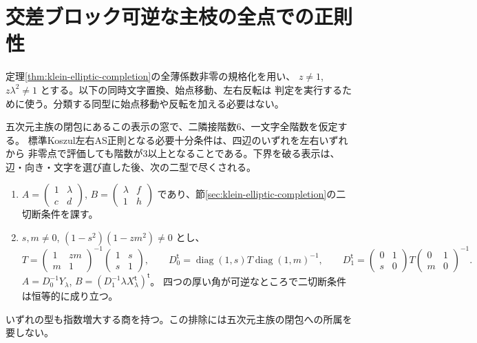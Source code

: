 \section{交差ブロック可逆な主枝の全点での正則性}
\label{sec:elliptic-evaluation-obstructions}
定理\ref{thm:klein-elliptic-completion}の全薄係数非零の規格化を用い、
$z\ne1$, $z\lambda^2\ne1$ とする。以下の同時文字置換、始点移動、左右反転は
判定を実行するために使う。分類する同型に始点移動や反転を加える必要はない。
\begin{theorem}\label{thm:elliptic-evaluation-obstructions}
五次元主族の閉包にあるこの表示の窓で、二隣接階数6、一文字全階数を仮定する。
標準Koszul左右AS正則となる必要十分条件は、四辺のいずれを左右いずれから
非零点で評価しても階数が3以上となることである。下界を破る表示は、
辺・向き・文字を選び直した後、次の二型で尽くされる。
\begin{enumerate}
\item $A=\left(\begin{smallmatrix}1&\lambda\\c&d\end{smallmatrix}\right)$,
$B=\left(\begin{smallmatrix}\lambda&f\\1&h\end{smallmatrix}\right)$
であり、節\ref{sec:klein-elliptic-completion}の二切断条件を課す。
\item $s,m\ne0$, $(1-s^2)(1-zm^2)\ne0$ とし、
\[
 T=\begin{pmatrix}1&zm\\m&1\end{pmatrix}^{-1}
       \begin{pmatrix}1&s\\s&1\end{pmatrix},\qquad
 D_0^{\mathsf t}=\operatorname{diag}(1,s)T\operatorname{diag}(1,m)^{-1},
 \qquad
 D_1^{\mathsf t}=\begin{pmatrix}0&1\\s&0\end{pmatrix}
                  T\begin{pmatrix}0&1\\m&0\end{pmatrix}^{-1}.
\]
$A=D_0^{-1}Y_\lambda$, $B=(D_1^{-1}\lambda X_\lambda^{\mathsf t})^{\mathsf t}$。
四つの厚い角が可逆なところで二切断条件は恒等的に成り立つ。
\end{enumerate}
いずれの型も指数増大する商を持つ。この排除には五次元主族の閉包への所属を要しない。
\end{theorem}
